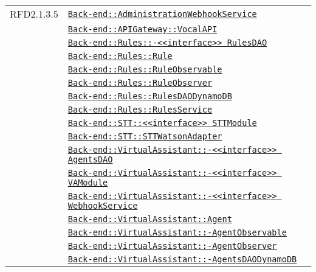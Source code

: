 \begin{longtable}{|>{\centering}m{3cm}|m{10cm}<{\centering}|}
RFD2.1.3.5 & \hyperref[Back-end::AdministrationWebhookService]{\texttt{Back-end::AdministrationWebhookService}}\\
& \hyperref[Back-end::APIGateway::VocalAPI]{\texttt{Back-end::APIGateway::VocalAPI}}\\
& \hyperref[Back-end::Rules::<<interface>> RulesDAO]{\texttt{Back-end::Rules::-\linebreak <<interface>> RulesDAO}}\\
& \hyperref[Back-end::Rules::Rule]{\texttt{Back-end::Rules::Rule}}\\
& \hyperref[Back-end::Rules::RuleObservable]{\texttt{Back-end::Rules::RuleObservable}}\\
& \hyperref[Back-end::Rules::RuleObserver]{\texttt{Back-end::Rules::RuleObserver}}\\
& \hyperref[Back-end::Rules::RulesDAODynamoDB]{\texttt{Back-end::Rules::RulesDAODynamoDB}}\\
& \hyperref[Back-end::Rules::RulesService]{\texttt{Back-end::Rules::RulesService}}\\
& \hyperref[Back-end::STT::<<interface>> STTModule]{\texttt{Back-end::STT::<<interface>> STTModule}}\\
& \hyperref[Back-end::STT::STTWatsonAdapter]{\texttt{Back-end::STT::STTWatsonAdapter}}\\
& \hyperref[Back-end::VirtualAssistant::<<interface>> AgentsDAO]{\texttt{Back-end::VirtualAssistant::-\linebreak <<interface>> AgentsDAO}}\\
& \hyperref[Back-end::VirtualAssistant::<<interface>> VAModule]{\texttt{Back-end::VirtualAssistant::-\linebreak <<interface>> VAModule}}\\
& \hyperref[Back-end::VirtualAssistant::<<interface>> WebhookService]{\texttt{Back-end::VirtualAssistant::-\linebreak <<interface>> WebhookService}}\\
& \hyperref[Back-end::VirtualAssistant::Agent]{\texttt{Back-end::VirtualAssistant::Agent}}\\
& \hyperref[Back-end::VirtualAssistant::AgentObservable]{\texttt{Back-end::VirtualAssistant::-\linebreak AgentObservable}}\\
& \hyperref[Back-end::VirtualAssistant::AgentObserver]{\texttt{Back-end::VirtualAssistant::-\linebreak AgentObserver}}\\
& \hyperref[Back-end::VirtualAssistant::AgentsDAODynamoDB]{\texttt{Back-end::VirtualAssistant::-\linebreak AgentsDAODynamoDB}}\\

\end{longtable}
